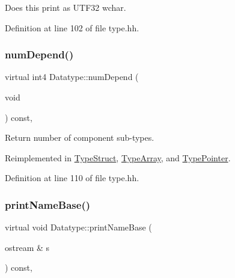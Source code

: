 Does this print as U\+T\+F32 \textquotesingle{}wchar\textquotesingle{}. 



Definition at line 102 of file type.\+hh.

\mbox{\label{class_datatype_ad29076ac4c3a28363df8f700c6fe4ffd}} 
\subsubsection{\texorpdfstring{numDepend()}{numDepend()}}
{\footnotesize\ttfamily virtual int4 Datatype\+::num\+Depend (\begin{DoxyParamCaption}\item[{void}]{ }\end{DoxyParamCaption}) const\hspace{0.3cm}{\ttfamily [inline]}, {\ttfamily [virtual]}}



Return number of component sub-\/types. 



Reimplemented in \mbox{\hyperlink{class_type_struct_ad4722efdae4b6f71e7c9d2b6624e4c12}{Type\+Struct}}, \mbox{\hyperlink{class_type_array_a556eb708ac21f5a9132efbf865a34831}{Type\+Array}}, and \mbox{\hyperlink{class_type_pointer_a376a0feb3fb85e98df0a7a9f1eeee0ce}{Type\+Pointer}}.



Definition at line 110 of file type.\+hh.

\mbox{\label{class_datatype_aec50467c2d81d22daf052a95e283a24a}} 
\subsubsection{\texorpdfstring{printNameBase()}{printNameBase()}}
{\footnotesize\ttfamily virtual void Datatype\+::print\+Name\+Base (\begin{DoxyParamCaption}\item[{ostream \&}]{s }\end{DoxyParamCaption}) const\hspace{0.3cm}{\ttfamily [inline]}, {\ttfamily [virtual]}}



